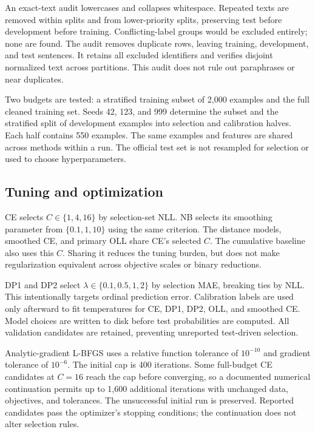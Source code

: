 \documentclass[10pt,twocolumn]{article}
\begin{document}
An exact-text audit lowercases and collapses whitespace. Repeated texts are removed within splits and from lower-priority splits, preserving test before development before training. Conflicting-label groups would be excluded entirely; none are found. The audit removes \RemovedCount{} duplicate rows, leaving \TrainCount{} training, \DevCount{} development, and \TestCount{} test sentences. It retains all excluded identifiers and verifies disjoint normalized text across partitions. This audit does not rule out paraphrases or near duplicates.

Two budgets are tested: a stratified training subset of 2,000 examples and the full cleaned training set. Seeds 42, 123, and 999 determine the subset and the stratified split of development examples into selection and calibration halves. Each half contains 550 examples. The same examples and features are shared across methods within a run. The official test set is not resampled for selection or used to choose hyperparameters.

\subsection{Tuning and optimization}
CE selects $C\in\{1,4,16\}$ by selection-set NLL. NB selects its smoothing parameter from $\{0.1,1,10\}$ using the same criterion. The distance models, smoothed CE, and primary OLL share CE's selected $C$. The cumulative baseline also uses this $C$. Sharing it reduces the tuning burden, but does not make regularization equivalent across objective scales or binary reductions.

DP1 and DP2 select $\lambda\in\{0.1,0.5,1,2\}$ by selection MAE, breaking ties by NLL. This intentionally targets ordinal prediction error. Calibration labels are used only afterward to fit temperatures for CE, DP1, DP2, OLL, and smoothed CE. Model choices are written to disk before test probabilities are computed. All validation candidates are retained, preventing unreported test-driven selection.

Analytic-gradient L-BFGS uses a relative function tolerance of $10^{-10}$ and gradient tolerance of $10^{-6}$. The initial cap is 400 iterations. Some full-budget CE candidates at $C=16$ reach the cap before converging, so a documented numerical continuation permits up to 1,600 additional iterations with unchanged data, objectives, and tolerances. The unsuccessful initial run is preserved. Reported candidates pass the optimizer's stopping conditions; the continuation does not alter selection rules.
\end{document}

